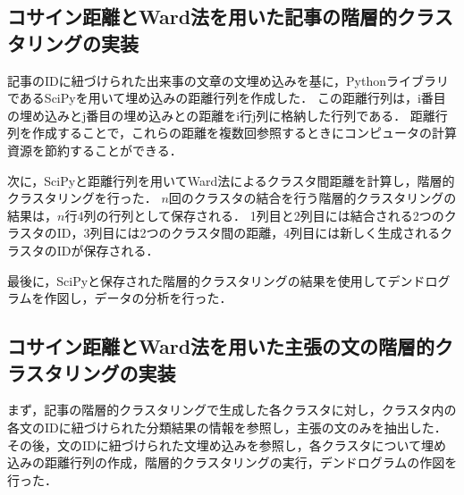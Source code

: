 \documentclass[12pt,a4j]{jreport}
\begin{document}

\subsection{コサイン距離とWard法を用いた記事の階層的クラスタリングの実装}
記事のIDに紐づけられた出来事の文章の文埋め込みを基に，PythonライブラリであるSciPyを用いて埋め込みの距離行列を作成した．
この距離行列は，i番目の埋め込みとj番目の埋め込みとの距離をi行j列に格納した行列である．
距離行列を作成することで，これらの距離を複数回参照するときにコンピュータの計算資源を節約することができる．

次に，SciPyと距離行列を用いてWard法によるクラスタ間距離を計算し，階層的クラスタリングを行った．
$n$回のクラスタの結合を行う階層的クラスタリングの結果は，$n$行4列の行列として保存される．
1列目と2列目には結合される2つのクラスタのID，3列目には2つのクラスタ間の距離，4列目には新しく生成されるクラスタのIDが保存される．

最後に，SciPyと保存された階層的クラスタリングの結果を使用してデンドログラムを作図し，データの分析を行った．


\subsection{コサイン距離とWard法を用いた主張の文の階層的クラスタリングの実装}
まず，記事の階層的クラスタリングで生成した各クラスタに対し，クラスタ内の各文のIDに紐づけられた分類結果の情報を参照し，主張の文のみを抽出した．
その後，文のIDに紐づけられた文埋め込みを参照し，各クラスタについて埋め込みの距離行列の作成，階層的クラスタリングの実行，デンドログラムの作図を行った．


\end{document}
